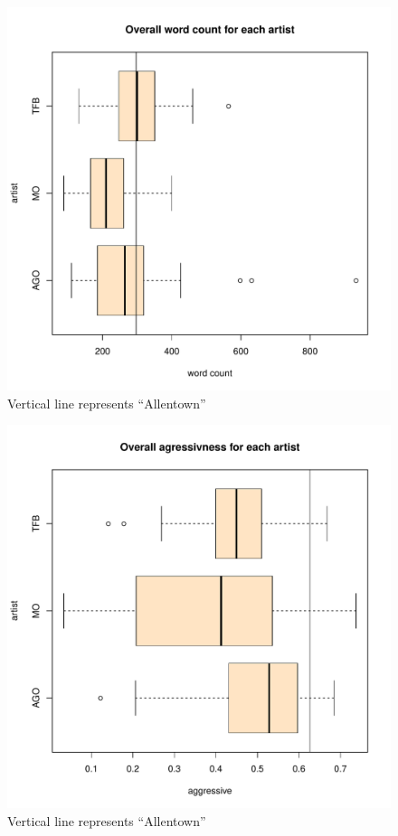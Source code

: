 \documentclass{article}\usepackage[]{graphicx}\usepackage[]{xcolor}
\makeatletter
\def\maxwidth{ %
  \ifdim\Gin@nat@width>\linewidth
    \linewidth
  \else
    \Gin@nat@width
  \fi
}
\newenvironment{knitrout}{}{} %
\makeatother
\begin{document}
\begin{multicols}{2}
\begin{figure}[H]
\begin{knitrout}\scriptsize
{}\color{fgcolor}
\includegraphics[width=\maxwidth]{figure/unnamed-chunk-4-1} 
\end{knitrout}
\caption{Vertical line represents ``Allentown''} \label{plot2}
\end{figure}

\begin{figure}[H]
\begin{knitrout}\scriptsize
{}\color{fgcolor}
\includegraphics[width=\maxwidth]{figure/unnamed-chunk-5-1} 
\end{knitrout}
\caption{Vertical line represents ``Allentown''} \label{plot3}
\end{figure}


\end{multicols}
\end{document}
